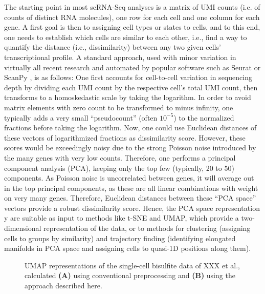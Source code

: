 \documentclass[twocolumn,10pt]{article}
\begin{document}
The starting point in most scRNA-Seq analyses is a matrix of UMI counts (i.e. of counts of distinct RNA molecules), one row for each cell and one column for each gene. A first goal is then to assigning cell types or states to cells, and to this end, one needs to establish which cells are similar to each other, i.e., find a way to quantify the distance (i.e., dissimilarity) between any two given cells' transcriptional profile. A standard approach, used with minor variation in virtually all recent research and automated by popular software such as Seurat \citep{Hao_2021} or ScanPy \citep{Wolf_2018}, is as follows: One first accounts for cell-to-cell variation in sequencing depth by dividing each UMI count by the respective cell's total UMI count, then transforms to a homoskedastic scale by taking the logarithm. In order to avoid matrix elements with zero count to be transformed to minus infinity, one typically adds a very small ``pseudocount'' (often $10^{-5}$) to the normalized fractions before taking the logarithm. Now, one could use Euclidean distances of these vectors of logarithmized fractions as dissimilarity score. However, these scores would be exceedingly noisy due to the strong Poisson noise introduced by the many genes with very low counts. Therefore, one performs a principal component analysis (PCA), keeping only the top few (typically, 20 to 50) components. As Poisson noise is uncorrelated between genes, it will average out in the top principal components, as these are all linear combinations with weight on very many genes. Therefore, Euclidean distances between these ``PCA space'' vectors provide a robust dissimilarity score. Hence, the PCA space representation y are suitable as input to methods like t-SNE and UMAP, which provide a two-dimensional representation of the data, or to methods for clustering (assigning cells to groups by similarity) and trajectory finding (identifying elongated manifolds in PCA space and assigning cells to quasi-1D positions along them).

\begin{figure}
	\caption{\small UMAP representations of the single-cell bisulfite data of XXX et al., calculated \textbf{(A)} using conventional preprocessing and \textbf{(B)} using the approach described here.}
	\label{umaps}
\end{figure}
\end{document}
